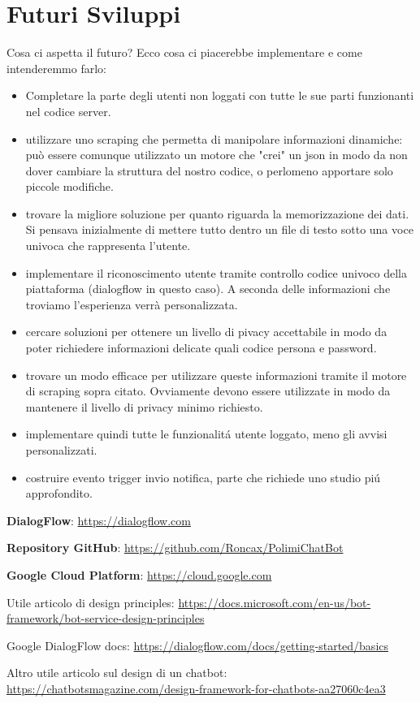 \documentclass[]{article}
\begin{document}
\section{Futuri Sviluppi}
Cosa ci aspetta il futuro? Ecco cosa ci piacerebbe implementare e come intenderemmo farlo:
\begin{itemize}
\item Completare la parte degli utenti non loggati con tutte le sue parti funzionanti nel codice server.
\item utilizzare uno scraping che permetta di manipolare informazioni dinamiche: può essere comunque utilizzato un motore che "crei" un json in modo da non dover cambiare la struttura del nostro codice, o perlomeno apportare solo piccole modifiche.
\item trovare la migliore soluzione per quanto riguarda la memorizzazione dei dati. Si pensava inizialmente di mettere tutto dentro un file di testo sotto una voce univoca che rappresenta l'utente.
\item implementare il riconoscimento utente tramite controllo codice univoco della piattaforma (dialogflow in questo caso). A seconda delle informazioni che troviamo l'esperienza verrà personalizzata.
\item cercare soluzioni per ottenere un livello di pivacy accettabile in modo da poter richiedere informazioni delicate quali codice persona e password.
\item trovare un modo efficace per utilizzare queste informazioni tramite il motore di scraping sopra citato. Ovviamente devono essere utilizzate in modo da mantenere il livello di privacy minimo richiesto.
\item implementare quindi tutte le funzionalitá utente loggato, meno gli avvisi personalizzati.
\item costruire evento trigger invio notifica, parte che richiede uno studio piú approfondito.
\end{itemize}

\newpage

\begin{thebibliography}{9}
\textbf{DialogFlow}: \url{https://dialogflow.com}
 
\textbf{Repository GitHub}: \url{https://github.com/Roncax/PolimiChatBot}
 
\textbf{Google Cloud Platform}: \url{https://cloud.google.com}
 
Utile articolo di design principles: \url{https://docs.microsoft.com/en-us/bot-framework/bot-service-design-principles}

Google DialogFlow docs: \url{https://dialogflow.com/docs/getting-started/basics}

Altro utile articolo sul design di un chatbot: \url{https://chatbotsmagazine.com/design-framework-for-chatbots-aa27060c4ea3}

\end{thebibliography}
\end{document}
